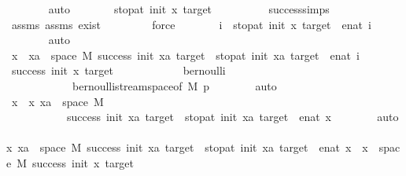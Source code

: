 \begin{isabellebody}
\ \ \ \ \ \ \isamarkupfalse%
\ auto\isanewline
\ \ \ \ \isamarkupfalse%
\ \isamarkupfalse%
\ {\isachardoublequoteopen}stop{\isacharunderscore}{\kern0pt}at\ init\ x\ target\ {\isasymnoteq}\ {\isasyminfinity}{\isachardoublequoteclose}\isanewline
\ \ \ \ \ \ \isamarkupfalse%
\ success{\isachardot}{\kern0pt}simps\isanewline
\ \ \ \ \ \ \isamarkupfalse%
\ assms{\isacharparenleft}{\kern0pt}{}{\isacharparenright}{\kern0pt}\ assms{\isacharparenleft}{\kern0pt}{}{\isacharparenright}{\kern0pt}\ exist\ \isanewline
\ \ \ \ \ \ \isamarkupfalse%
\ force\isanewline
\ \ \ \ \isamarkupfalse%
\ \isamarkupfalse%
\ i\ \ {\isachardoublequoteopen}stop{\isacharunderscore}{\kern0pt}at\ init\ x\ target\ {\isacharequal}{\kern0pt}\ enat\ i{\isachardoublequoteclose}\isanewline
\ \ \ \ \ \ \isamarkupfalse%
\ auto\isanewline
\ \ \ \ \isamarkupfalse%
\ \isamarkupfalse%
\ {\isachardoublequoteopen}x\ {\isasymin}\ {\isacharbraceleft}{\kern0pt}xa\ {\isasymin}\ space\ M{\isachardot}{\kern0pt}\ success\ init\ xa\ target\ {\isasymand}\ stop{\isacharunderscore}{\kern0pt}at\ init\ xa\ target\ {\isacharequal}{\kern0pt}\ enat\ i{\isacharbraceright}{\kern0pt}{\isachardoublequoteclose}\isanewline
\ \ \ \ \ \ \isamarkupfalse%
\ {\isacartoucheopen}success\ init\ x\ target{\isacartoucheclose}\isanewline
\ \ \ \ \ \ \ \ \ \ \ \ bernoulli\isanewline
\ \ \ \ \ \ \ \ \ \ \ \ bernoulli{\isacharunderscore}{\kern0pt}stream{\isacharunderscore}{\kern0pt}space{\isacharbrackleft}{\kern0pt}of\ M\ p{\isacharbrackright}{\kern0pt}\isanewline
\ \ \ \ \ \ \isamarkupfalse%
\ auto\isanewline
\ \ \ \ \isamarkupfalse%
\ \isamarkupfalse%
\ {\isachardoublequoteopen}x\ {\isasymin}\ {\isacharparenleft}{\kern0pt}{\isasymUnion}x{\isachardot}{\kern0pt}\ {\isacharbraceleft}{\kern0pt}xa\ {\isasymin}\ space\ M{\isachardot}{\kern0pt}\isanewline
\ \ \ \ \ \ \ \ \ \ \ success\ init\ xa\ target\ {\isasymand}\ stop{\isacharunderscore}{\kern0pt}at\ init\ xa\ target\ {\isacharequal}{\kern0pt}\ enat\ x{\isacharbraceright}{\kern0pt}{\isacharparenright}{\kern0pt}{\isachardoublequoteclose}\isanewline
\ \ \ \ \ \ \isamarkupfalse%
\ auto\isanewline
\ \ \isamarkupfalse%
\isanewline
{}\isamarkupfalse%
\ \isanewline
\ \ \isamarkupfalse%
{\isachardoublequoteopen}{\isacharparenleft}{\kern0pt}{\isasymUnion}x{\isachardot}{\kern0pt}\ {\isacharbraceleft}{\kern0pt}xa\ {\isasymin}\ space\ M{\isachardot}{\kern0pt}\ success\ init\ xa\ target\ {\isasymand}\ stop{\isacharunderscore}{\kern0pt}at\ init\ xa\ target\ {\isacharequal}{\kern0pt}\ enat\ x{\isacharbraceright}{\kern0pt}{\isacharparenright}{\kern0pt}\ {\isasymsubseteq}\ {\isacharbraceleft}{\kern0pt}x\ {\isasymin}\ space\ M{\isachardot}{\kern0pt}\ success\ init\ x\ target{\isacharbraceright}{\kern0pt}{\isachardoublequoteclose}\isanewline

\end{isabellebody}
